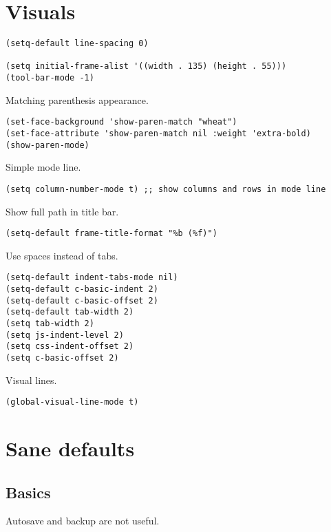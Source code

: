 \documentclass[11pt]{article}
\begin{document}
\section{Visuals}
\label{sec:orgbb19406}

\begin{verbatim}
(setq-default line-spacing 0)

(setq initial-frame-alist '((width . 135) (height . 55)))
(tool-bar-mode -1)
\end{verbatim}

Matching parenthesis appearance.

\begin{verbatim}
(set-face-background 'show-paren-match "wheat")
(set-face-attribute 'show-paren-match nil :weight 'extra-bold)
(show-paren-mode)
\end{verbatim}

Simple mode line.

\begin{verbatim}
(setq column-number-mode t) ;; show columns and rows in mode line
\end{verbatim}

Show full path in title bar.

\begin{verbatim}
(setq-default frame-title-format "%b (%f)")
\end{verbatim}

Use spaces instead of tabs.

\begin{verbatim}
(setq-default indent-tabs-mode nil)
(setq-default c-basic-indent 2)
(setq-default c-basic-offset 2)
(setq-default tab-width 2)
(setq tab-width 2)
(setq js-indent-level 2)
(setq css-indent-offset 2)
(setq c-basic-offset 2)
\end{verbatim}

Visual lines.

\begin{verbatim}
(global-visual-line-mode t)
\end{verbatim}

\section{Sane defaults}
\label{sec:org52360fa}
\subsection{Basics}
\label{sec:orgd46fe8b}

Autosave and backup are not useful.
\end{document}
